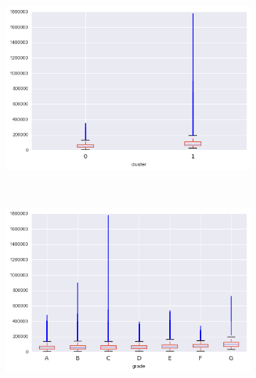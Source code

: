 \begin{anexosenv}
\begin{figure}[t!]
\begin{subfigure}[t]{0.5\textwidth}
            \centerline{\includegraphics[width=1\textwidth]{img/annual_inc_by_cluster}}
        \end{subfigure}%
        ~ 
        \begin{subfigure}[t]{0.5\textwidth}
            \centering
   
            \centerline{\includegraphics[width=1\textwidth]{img/annual_inc_by_grade}}

        \end{subfigure}
        \\
                \caption{delinq\textunderscore 2yrs}
        \begin{subfigure}[t]{0.5\textwidth}
            \centering


\end{subfigure}
\end{figure}
\end{anexosenv}
